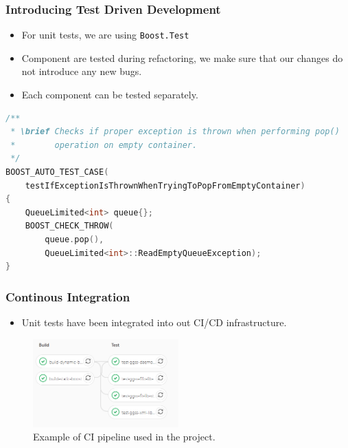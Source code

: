 \documentclass[10pt]{beamer}
\begin{document}
\begin{frame}[fragile]
\frametitle{Introducing Test Driven Development}
\begin{itemize}
\item For unit tests, we are using \lstinline[basicstyle=\ttfamily\normalsize]{Boost.Test}
\item Component are tested during refactoring, we make sure that our changes do not introduce any new bugs.
\item Each component can be tested separately.
\end{itemize}
\begin{lstlisting}[language=c++, caption={Unit test example}]
/**
 * \brief Checks if proper exception is thrown when performing pop() 
 *        operation on empty container.
 */
BOOST_AUTO_TEST_CASE(
    testIfExceptionIsThrownWhenTryingToPopFromEmptyContainer)
{
    QueueLimited<int> queue{};
    BOOST_CHECK_THROW(
        queue.pop(), 
        QueueLimited<int>::ReadEmptyQueueException);
}   
\end{lstlisting}
\end{frame}

\begin{frame}[fragile]
\frametitle{Continous Integration}
\begin{itemize}
\item Unit tests have been integrated into out CI/CD infrastructure.
\end{itemize}
\begin{figure}
\centering
\includegraphics[width=0.5\textwidth]{resources/pipeline_example.png}
\caption{Example of CI pipeline used in the project.}
\end{figure}
\end{frame}
\end{document}
